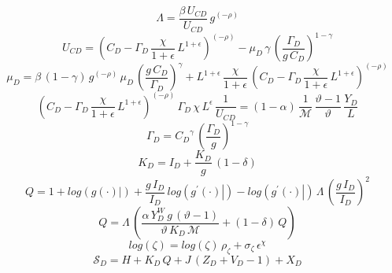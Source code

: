 \documentclass[10pt,a4paper]{article}
\begin{document}
\begin{dmath}
{\Lambda}=\frac{\beta\, {U_{CD}}}{{U_{CD}}}\, {g}^{\left(-\rho\right)}
\end{dmath}
\begin{dmath}
{U_{CD}}=\left({C_D}-{\Gamma_D}\, \frac{\chi}{1+\epsilon}\, {L}^{1+\epsilon}\right)^{\left(-\rho\right)}-{{\mu}_{D}}\, \gamma\, \left(\frac{{\Gamma_D}}{{g}\, {C_D}}\right)^{1-\gamma}
\end{dmath}
\begin{dmath}
{{\mu}_{D}}=\beta\, \left(1-\gamma\right)\, {g}^{\left(-\rho\right)}\, {{\mu}_{D}}\, \left(\frac{{g}\, {C_D}}{{\Gamma_D}}\right)^{\gamma}+{L}^{1+\epsilon}\, \frac{\chi}{1+\epsilon}\, \left({C_D}-{\Gamma_D}\, \frac{\chi}{1+\epsilon}\, {L}^{1+\epsilon}\right)^{\left(-\rho\right)}
\end{dmath}
\begin{dmath}
\left({C_D}-{\Gamma_D}\, \frac{\chi}{1+\epsilon}\, {L}^{1+\epsilon}\right)^{\left(-\rho\right)}\, {\Gamma_D}\, \chi\, {L}^{\epsilon}\, \frac{1}{{U_{CD}}}=\left(1-\alpha\right)\, \frac{1}{{\mathcal{M}}}\, \frac{\vartheta-1}{\vartheta}\, \frac{{Y_D}}{{L}}
\end{dmath}
\begin{dmath}
{\Gamma_D}={C_D}^{\gamma}\, \left(\frac{{\Gamma_D}}{{g}}\right)^{1-\gamma}
\end{dmath}
\begin{dmath}
{K_D}={I_D}+\frac{{K_D}}{{g}}\, \left(1-\delta\right)
\end{dmath}
\begin{dmath}
{Q}=1+log\left({\left.       g\left( \cdot \right)            \right|}\right)+\frac{{g}\, {I_D}}{{I_D}}\, log\left({\left.       g^{\prime}\left( \cdot \right)   \right|}\right)-log\left({\left.       g^{\prime}\left( \cdot \right)   \right|}\right)\, {\Lambda}\, \left(\frac{{g}\, {I_D}}{{I_D}}\right)^{2}
\end{dmath}
\begin{dmath}
{Q}={\Lambda}\, \left(\frac{\alpha\, {Y^W_D}\, {g}\, \left(\vartheta-1\right)}{\vartheta\, {K_D}\, {\mathcal{M}}}+\left(1-\delta\right)\, {Q}\right)
\end{dmath}
\begin{dmath}
log\left({\zeta}\right)=log\left({\zeta}\right)\, {{\rho}_{\zeta}}+{{\sigma}_{\zeta}}\, {\epsilon}^{\chi}
\end{dmath}
\begin{dmath}
{\mathcal{S}_{D}}={H}+{K_D}\, {Q}+{J}\, \left({Z_D}+{V_D}-1\right)+{X_D}
\end{dmath}
\end{document}
